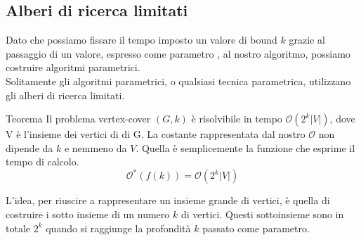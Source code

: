 \subsection{Alberi di ricerca limitati}
Dato che possiamo fissare il tempo imposto un valore di bound $k$ grazie al passaggio di un valore, espresso come parametro , al nostro algoritmo, possiamo costruire algoritmi parametrici.\\
Solitamente gli algoritmi parametrici, o qualsiasi tecnica parametrica, utilizzano gli alberi di ricerca limitati. 

\begin{teorema}{Teorema}{}
    Il problema vertex-cover $(G,k)$ è risolvibile in tempo $\mathcal{O}(2^k |V|)$, dove V è l'insieme dei vertici di di G. La costante rappresentata dal nostro $\mathcal{O}$ non dipende da $k$ e nemmeno da $V$. Quella è semplicemente la funzione che esprime il tempo di calcolo.
    $$\mathcal{O^*}(f(k)) = \mathcal{O}(2^k |V|)$$
\end{teorema}

L'idea, per riuscire a rappresentare un insieme grande di vertici, è quella di costruire i sotto insieme di un numero $k$ di vertici. Questi sottoinsieme sono in totale $2^k$ quando si raggiunge la profondità $k$ passato come parametro.